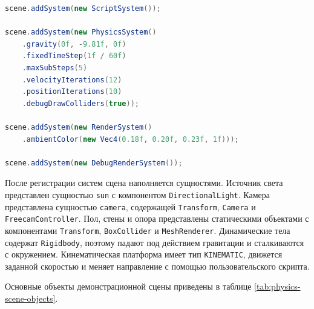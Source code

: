 \begin{lstlisting}[language=Java]
scene.addSystem(new ScriptSystem());

scene.addSystem(new PhysicsSystem()
    .gravity(0f, -9.81f, 0f)
    .fixedTimeStep(1f / 60f)
    .maxSubSteps(5)
    .velocityIterations(12)
    .positionIterations(10)
    .debugDrawColliders(true));

scene.addSystem(new RenderSystem()
    .ambientColor(new Vec4(0.18f, 0.20f, 0.23f, 1f)));

scene.addSystem(new DebugRenderSystem());
\end{lstlisting}

После регистрации систем сцена наполняется сущностями. Источник света представлен
сущностью \texttt{sun} с компонентом \texttt{DirectionalLight}. Камера представлена
сущностью \texttt{camera}, содержащей \texttt{Transform}, \texttt{Camera} и
\texttt{FreecamController}. Пол, стены и опора представлены статическими объектами
с компонентами \texttt{Transform}, \texttt{BoxCollider} и \texttt{MeshRenderer}.
Динамические тела содержат \texttt{Rigidbody}, поэтому падают под действием
гравитации и сталкиваются с окружением. Кинематическая платформа имеет тип
\texttt{KINEMATIC}, движется заданной скоростью и меняет направление с помощью
пользовательского скрипта.

Основные объекты демонстрационной сцены приведены в таблице
\ref{tab:physics-scene-objects}.

\begingroup
\small
\setlength{\tabcolsep}{4pt}
\renewcommand{\arraystretch}{1.2}

